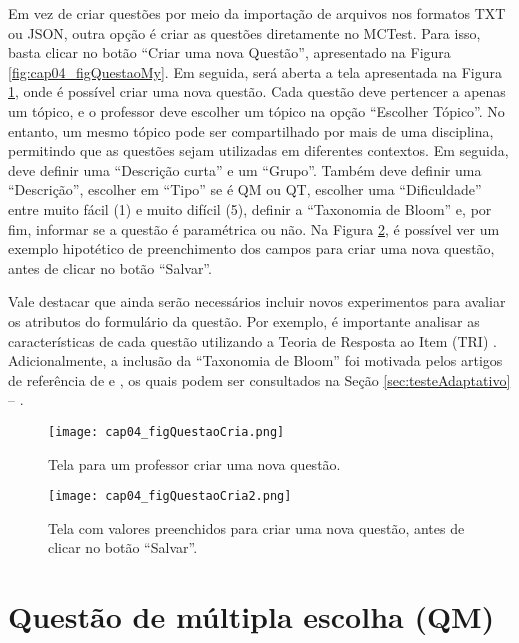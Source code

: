 Em vez de criar questões por meio da importação de arquivos nos formatos TXT ou JSON, outra opção é criar as questões diretamente no MCTest. Para isso, basta clicar no botão ``Criar uma nova Questão'', apresentado na Figura \ref{fig:cap04_figQuestaoMy}. Em seguida, será aberta a tela apresentada na Figura \ref{fig:cap04_figQuestaoCria}, onde é possível criar uma nova questão. Cada questão deve pertencer a apenas um tópico, e o professor deve escolher um tópico na opção ``Escolher Tópico''. No entanto, um mesmo tópico pode ser compartilhado por mais de uma disciplina, permitindo que as questões sejam utilizadas em diferentes contextos. Em seguida, deve definir uma ``Descrição curta'' e um ``Grupo''. Também deve definir uma ``Descrição'', escolher em ``Tipo'' se é QM ou QT, escolher uma ``Dificuldade'' entre muito fácil (1) e muito difícil (5), definir a ``Taxonomia de Bloom'' e, por fim, informar se a questão é paramétrica ou não. Na Figura \ref{fig:cap04_figQuestaoCria2}, é possível ver um exemplo hipotético de preenchimento dos campos para criar uma nova questão, antes de clicar no botão ``Salvar''.

Vale destacar que ainda serão necessários incluir novos experimentos para avaliar os atributos do formulário da questão. Por exemplo, é importante analisar as características de cada questão utilizando a Teoria de Resposta ao Item (TRI) \cite{2021:Zampirolli.Junior.ea,2021:Zampirolli.Batista.ea}. Adicionalmente, a inclusão da ``Taxonomia de Bloom'' foi motivada pelos artigos de referência de  e , os quais podem ser consultados na Seção \ref{sec:testeAdaptativo} -- .

\begin{figure}[!ht]
  \centering
  \texttt{[image: cap04\_figQuestaoCria.png]}
  \caption{Tela para um professor criar uma nova questão.}
  \label{fig:cap04_figQuestaoCria}
\end{figure}

\begin{figure}[!ht]
  \centering
  \texttt{[image: cap04\_figQuestaoCria2.png]}
  \caption{Tela com valores preenchidos para criar uma nova questão, antes de clicar no botão ``Salvar''.}
  \label{fig:cap04_figQuestaoCria2}
\end{figure}

\section{Questão de múltipla escolha (QM)}\label{sec:questaoQM}

